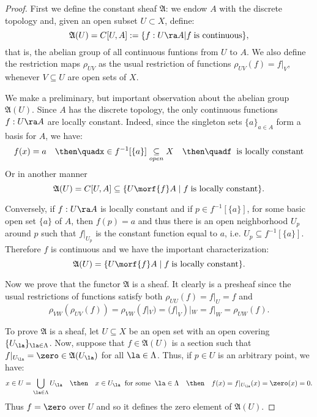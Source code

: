 \begin{proof}%

First we define the constant sheaf $\mathfrak{A}$: we endow $A$ with the
discrete topology and, given an open subset $U\subset X$, define:
\[
	\mathfrak{A}(U)=C[U,A]:=\{f:U\ra A| f\;\text{is continuous}\},
\]
that is, the abelian group of all continuous funtions from $U$ to $A$. We
also define the restriction maps $\rho_{UV}$ as the usual restriction of
functions $\rho_{UV}(f)=f|_V$, whenever $V\subseteq U$ are open sets of $X$.

We make a preliminary, but important observation about the abelian group
$\mathfrak{A}(U)$. Since $A$ has the discrete topology, 
the only continuous functions $f:U\ra A$ are locally constant. Indeed, since
the singleton sets $\{a\}_{a\in A}$ form a basis for $A$, we have:
\[
	f(x)=a \quad\then\quad%
	x\in f^{-1}[\{a\}]\underset{open}{\subseteq} X \quad\then\quad%
	f\;\;\text{is locally constant}
\]
Or in another manner
\[
	\mathfrak{A}(U)=C[U,A]\subseteq\{U\morf{f}A\;|\; f\;\text{is locally constant}\}.
\]

Conversely, if $f:U\ra A$ is locally constant and if $p\in f^{-1}[\{a\}]$,
for some basic open set $\{a\}$ of $A$, then $f(p)=a$ and thus there is an
open neighborhood $U_p$ around $p$ such that $f|_{U_p}$ is the constant function
equal to $a$, i.e. $U_p\subseteq f^{-1}[\{a\}]$. Therefore $f$ is continuous and we
have the important characterization:%
%
\begin{equation}\label{localconstant}
	\mathfrak{A}(U)=\{U\morf{f}A\;|\; f\;\text{is locally constant}\}.
\end{equation}

Now we prove that the functor $\mathfrak{A}$ is a sheaf. It clearly is a presheaf
since the usual restrictions of functions satisfy both $\rho_{UU}(f)=f|_{U}=f$ and
\[
	\rho_{VW}(\rho_{UV}(f))=\rho_{VW}(f|_V)=(f|_V)|_{W}=f|_W=\rho_{UW}(f).
\]

To prove $\mathfrak{A}$ is a sheaf, let $U\subseteq X$ be an open set with an
open covering $\{U_{\la}\}_{\la\in\Lambda}$. Now, suppose that $f\in\mathfrak{A}(U)$
is a section such that $f|_{U_{\la}}=\zero\in \mathfrak{A}(U_{\la})$
for all $\la\in\Lambda$. Thus, if $p\in U$ is an arbitrary point, we have:
\[
	x\in U=\bigcup_{\la\in\Lambda}U_{\la} \quad\then\quad %
	x\in U_{\la}\;\;\text{for some}\;\; \la\in\Lambda \quad\then\quad %
	f(x)=f|_{U_{\la}}(x)=\zero(x)=0.
\]
Thus $f=\zero$ over $U$ and so it defines the zero element of $\mathfrak{A}(U)$.


\end{proof}
